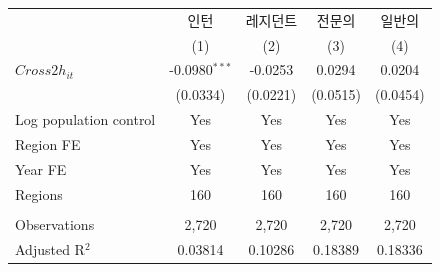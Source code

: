 \begingroup
\centering
\begin{tabular}{lcccc}
   \toprule
                          & 인턴            & 레지던트 & 전문의   & 일반의 \\   
                          & (1)             & (2)      & (3)      & (4)\\  
   \midrule 
   $Cross2h_{it}$         & -0.0980$^{***}$ & -0.0253  & 0.0294   & 0.0204\\   
                          & (0.0334)        & (0.0221) & (0.0515) & (0.0454)\\   
   Log population control & Yes             & Yes      & Yes      & Yes\\  
   Region FE              & Yes             & Yes      & Yes      & Yes\\  
   Year FE                & Yes             & Yes      & Yes      & Yes\\  
   Regions                & 160             & 160      & 160      & 160\\  
    \\
   Observations           & 2,720           & 2,720    & 2,720    & 2,720\\  
   Adjusted R$^2$         & 0.03814         & 0.10286  & 0.18389  & 0.18336\\  
   \bottomrule
\end{tabular}
\par\endgroup
